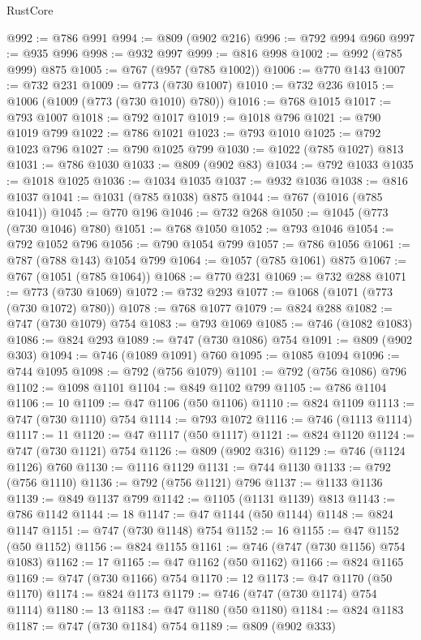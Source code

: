 \begin{lexlean}{RustCore}
\begin{coremodule}
@992 := @786 @991
@994 := @809 (@902 @216)
@996 := @792 @994 @960
@997 := @935 @996
@998 := @932 @997
@999 := @816 @998
@1002 := @992 (@785 @999) @875
@1005 := @767 (@957 (@785 @1002))
@1006 := @770 @143
@1007 := @732 @231
@1009 := @773 (@730 @1007)
@1010 := @732 @236
@1015 := @1006 (@1009 (@773 (@730 @1010) @780))
@1016 := @768 @1015
@1017 := @793 @1007
@1018 := @792 @1017
@1019 := @1018 @796
@1021 := @790 @1019 @799
@1022 := @786 @1021
@1023 := @793 @1010
@1025 := @792 @1023 @796
@1027 := @790 @1025 @799
@1030 := @1022 (@785 @1027) @813
@1031 := @786 @1030
@1033 := @809 (@902 @83)
@1034 := @792 @1033
@1035 := @1018 @1025
@1036 := @1034 @1035
@1037 := @932 @1036
@1038 := @816 @1037
@1041 := @1031 (@785 @1038) @875
@1044 := @767 (@1016 (@785 @1041))
@1045 := @770 @196
@1046 := @732 @268
@1050 := @1045 (@773 (@730 @1046) @780)
@1051 := @768 @1050
@1052 := @793 @1046
@1054 := @792 @1052 @796
@1056 := @790 @1054 @799
@1057 := @786 @1056
@1061 := @787 (@788 @143) @1054 @799
@1064 := @1057 (@785 @1061) @875
@1067 := @767 (@1051 (@785 @1064))
@1068 := @770 @231
@1069 := @732 @288
@1071 := @773 (@730 @1069)
@1072 := @732 @293
@1077 := @1068 (@1071 (@773 (@730 @1072) @780))
@1078 := @768 @1077
@1079 := @824 @288
@1082 := @747 (@730 @1079) @754
@1083 := @793 @1069
@1085 := @746 (@1082 @1083)
@1086 := @824 @293
@1089 := @747 (@730 @1086) @754
@1091 := @809 (@902 @303)
@1094 := @746 (@1089 @1091) @760
@1095 := @1085 @1094
@1096 := @744 @1095
@1098 := @792 (@756 @1079)
@1101 := @792 (@756 @1086) @796
@1102 := @1098 @1101
@1104 := @849 @1102 @799
@1105 := @786 @1104
@1106 := 10
@1109 := @47 @1106 (@50 @1106)
@1110 := @824 @1109
@1113 := @747 (@730 @1110) @754
@1114 := @793 @1072
@1116 := @746 (@1113 @1114)
@1117 := 11
@1120 := @47 @1117 (@50 @1117)
@1121 := @824 @1120
@1124 := @747 (@730 @1121) @754
@1126 := @809 (@902 @316)
@1129 := @746 (@1124 @1126) @760
@1130 := @1116 @1129
@1131 := @744 @1130
@1133 := @792 (@756 @1110)
@1136 := @792 (@756 @1121) @796
@1137 := @1133 @1136
@1139 := @849 @1137 @799
@1142 := @1105 (@1131 @1139) @813
@1143 := @786 @1142
@1144 := 18
@1147 := @47 @1144 (@50 @1144)
@1148 := @824 @1147
@1151 := @747 (@730 @1148) @754
@1152 := 16
@1155 := @47 @1152 (@50 @1152)
@1156 := @824 @1155
@1161 := @746 (@747 (@730 @1156) @754 @1083)
@1162 := 17
@1165 := @47 @1162 (@50 @1162)
@1166 := @824 @1165
@1169 := @747 (@730 @1166) @754
@1170 := 12
@1173 := @47 @1170 (@50 @1170)
@1174 := @824 @1173
@1179 := @746 (@747 (@730 @1174) @754 @1114)
@1180 := 13
@1183 := @47 @1180 (@50 @1180)
@1184 := @824 @1183
@1187 := @747 (@730 @1184) @754
@1189 := @809 (@902 @333)

\end{coremodule}
\end{lexlean}
